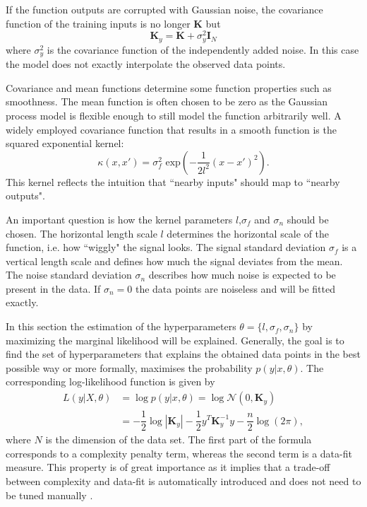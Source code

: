 \documentclass[../main.tex]{subfiles}
\begin{document}
If the function outputs are corrupted with Gaussian noise, the covariance function of the training inputs is no longer $\mathbf{K}$ but
\begin{equation}
    \mathbf{K}_y = \mathbf{K} + \sigma_y^2\mathbf{I}_N
\end{equation}
where $\sigma_y^2$ is the covariance function of the independently added noise. In this case the model does not exactly interpolate the observed data points.\par
Covariance and mean functions determine some function properties such as smoothness. The mean function is often chosen to be zero as the Gaussian process model is flexible enough to still model the function arbitrarily well. A widely employed covariance function that results in a smooth function is the squared exponential kernel:
\begin{equation}\label{eq:sqexp}
    \kappa(x,x') = \sigma^2_f \text{ exp}(-\dfrac{1}{2l^2}(x-x')^2).
\end{equation}
This kernel reflects the intuition that ``nearby inputs" should map to ``nearby outputs". \par 
An important question is how the kernel parameters $l$,$\sigma_f$ and $\sigma_n$ should be chosen. The horizontal length scale $l$ determines the horizontal scale of the function, i.e. how ``wiggly" the signal looks. The signal standard deviation $\sigma_f$ is a vertical length scale and defines how much the signal deviates from the mean. The noise standard deviation $\sigma_n$ describes how much noise is expected to be present in the data. If $\sigma_n = 0$ the data points are noiseless and will be fitted exactly. \par
In this section the estimation of the hyperparameters $\theta = \{l,\sigma_f, \sigma_n\}$ by maximizing the marginal likelihood will be explained. Generally, the goal is to find the set of hyperparameters that explains the obtained data points in the best possible way or more formally, maximises the probability $p(y|x,\theta)$. The corresponding log-likelihood function is given by
\begin{align}
    L(y|X, \theta) &= \log p(y|x,\theta) = \log \mathcal{N}(0,\mathbf{K}_y)\\
    &= -\dfrac{1}{2} \log|\mathbf{K}_y|-\dfrac{1}{2}y^T\mathbf{K}_y^{-1}y-\dfrac{n}{2}\log(2\pi),
\end{align}
where $N$ is the dimension of the data set. The first part of the formula corresponds to a complexity penalty term, whereas the second term is a data-fit measure. This property is of great importance as it implies that a trade-off between complexity and data-fit is automatically introduced and does not need to be tuned manually \cite{rasmussen2006gaussian}. 
\end{document}

